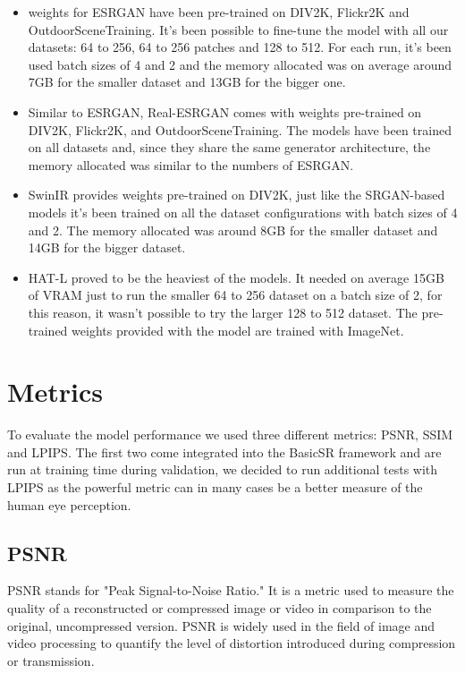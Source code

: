 \begin{itemize}
  \item weights for ESRGAN have been pre-trained on  DIV2K\cite{Agustsson_2017_CVPR_Workshops}, Flickr2K\cite{Lim_2017_CVPR_Workshops} and OutdoorSceneTraining\cite{wang2018recovering}. It's been possible to fine-tune the model with all our datasets: 64 to 256, 64 to 256 patches and 128 to 512. For each run, it's been used batch sizes of 4 and 2 and the memory allocated was on average around 7GB for the smaller dataset and 13GB for the bigger one.
  \item Similar to ESRGAN, Real-ESRGAN comes with weights pre-trained on DIV2K, Flickr2K, and OutdoorSceneTraining. The models have been trained on all datasets and, since they share the same generator architecture, the memory allocated was similar to the numbers of ESRGAN.
  \item SwinIR provides weights pre-trained on DIV2K, just like the SRGAN-based models it's been trained on all the dataset configurations with batch sizes of 4 and 2. The memory allocated was around 8GB for the smaller dataset and 14GB for the bigger dataset.
  \item HAT-L proved to be the heaviest of the models. It needed on average 15GB of VRAM just to run the smaller 64 to 256 dataset on a batch size of 2, for this reason, it wasn't possible to try the larger 128 to 512 dataset. The pre-trained weights provided with the model are trained with ImageNet\cite{deng2009imagenet}.
\end{itemize}

\section{Metrics}
\label{sec:metrics}

To evaluate the model performance we used three different metrics: PSNR, SSIM and LPIPS. The first two come integrated into the BasicSR framework and are run at training time during validation, we decided to run additional tests with LPIPS as the powerful metric can in many cases be a better measure of the human eye perception.

\subsection{PSNR}
\label{subsec:psnr}
  PSNR\cite{psnr} stands for "Peak Signal-to-Noise Ratio." It is a metric used to measure the quality of a reconstructed or compressed image or video in comparison to the original, uncompressed version. PSNR is widely used in the field of image and video processing to quantify the level of distortion introduced during compression or transmission.


